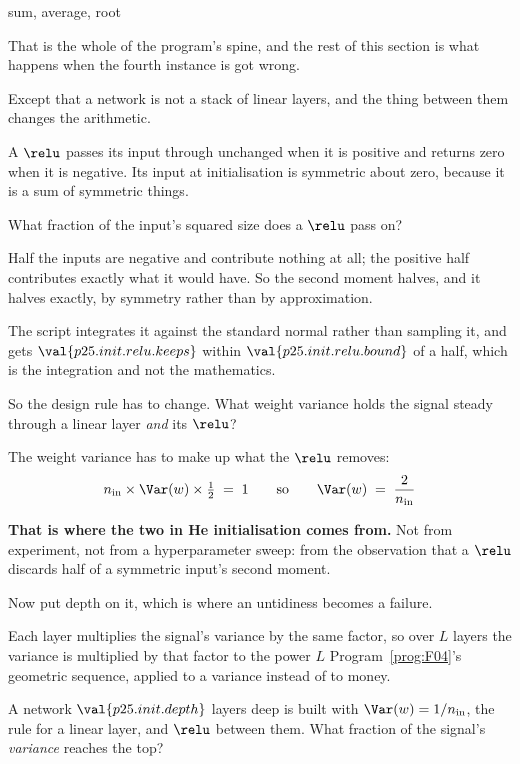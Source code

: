 \begin{fr}
%
{sum, average, root}

That is the whole of the program's spine, and the rest of this section is what
happens when the fourth instance is got wrong.
\end{fr}

\begin{fr}
Except that a network is not a stack of linear layers, and the thing between
them changes the arithmetic.

A $\relu$ passes its input through unchanged when it is positive and returns
zero when it is negative. Its input at initialisation is symmetric about zero,
because it is a sum of symmetric things.

What fraction of the input's squared size does a $\relu$ pass on?
\dotline
\nextframe
\end{fr}

\begin{fr}

Half the inputs are negative and contribute nothing at all; the positive half
contributes exactly what it would have. So the second moment halves, and it
halves exactly, by symmetry rather than by approximation.

The script integrates it against the standard normal rather than sampling it,
and gets $\val{p25.init.relu.keeps}$ \dash{} within
$\val{p25.init.relu.bound}$ of a half, which is the integration and not the
mathematics.

So the design rule has to change. What weight variance holds the signal steady
through a linear layer \emph{and} its $\relu$?
\dotline
\nextframe
\end{fr}

\begin{fr}

The weight variance has to make up what the $\relu$ removes:
\[ n_{\text{in}} \times \Var(w) \times \tfrac{1}{2} \;=\; 1
   \qquad\text{so}\qquad \Var(w) \;=\; \frac{2}{n_{\text{in}}} \]

\textbf{That is where the two in He initialisation comes from.} Not from
experiment, not from a hyperparameter sweep: from the observation that a
$\relu$ discards half of a symmetric input's second moment.
\end{fr}

\begin{fr}
Now put depth on it, which is where an untidiness becomes a failure.

Each layer multiplies the signal's variance by the same factor, so over $L$
layers the variance is multiplied by that factor to the power $L$ \dash{}
Program~\ref{prog:F04}'s geometric sequence, applied to a variance instead of
to money.

A network $\val{p25.init.depth}$ layers deep is built with
$\Var(w) = 1/n_{\text{in}}$, the rule for a linear layer, and $\relu$ between
them. What fraction of the signal's \emph{variance} reaches the top?
\dotline
\nextframe
\end{fr}

